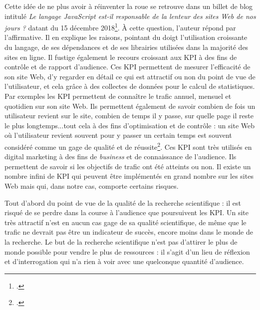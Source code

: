 \documentclass[a4paper,12pt,twoside]{book}
\begin{document}
Cette idée de ne plus avoir à réinventer la roue se retrouve dans un billet de blog intitulé \og \textit{Le langage JavaScript est-il
responsable de la lenteur des sites Web de nos jours ?} \fg datant du 15 décembre 2018\footcite{javascript}. À cette question, l'auteur répond par l'affirmative. Il en explique les raisons, pointant du doigt l'utilisation croissante du langage, de ses dépendances et de ses librairies utilisées dans la majorité des sites en ligne. Il fustige également le recours croissant aux \acrfull{KPI} à des fins de contrôle et de rapport d'audience. Ces \acrshort{KPI} permettent de mesurer l'\og efficacité \fg de son site Web, d'y regarder en détail ce qui est attractif ou non du point de vue de l'utilisateur, et cela grâce à des collectes de données pour le calcul de statistiques. Par exemples les \acrshort{KPI} permettent de connaître le trafic annuel, mensuel et quotidien sur son site Web. Ils permettent également de savoir combien de fois un utilisateur revient sur le site, combien de temps il y passe, sur quelle page il reste le plus longtemps...tout cela à des fins d'optimisation et de contrôle : un site Web où l'utilisateur revient souvent pour y passer un certain temps est souvent considéré comme un gage de qualité et de réussite\footcite{storm_website_2022}. Ces \acrshort{KPI} sont très utilisés en digital marketing à des fins de \textit{business} et de connaissance de l'audience. Ils permettent de savoir si les objectifs de trafic ont été atteints ou non. Il existe un nombre infini de \acrshort{KPI} qui peuvent être implémentés en grand nombre sur les sites Web mais qui, dans notre cas, comporte certains risques.

Tout d'abord du point de vue de la qualité de la recherche scientifique : il est risqué de se perdre dans la course à l'audience que poursuivent les \acrshort{KPI}. Un site très attractif n'est en aucun cas gage de sa qualité scientifique, de même que le trafic ne devrait pas être un indicateur de succès, encore moins dans le monde de la recherche. Le but de la recherche scientifique n'est pas d'attirer le plus de monde possible pour vendre le plus de ressources : il s'agit d'un lieu de réflexion et d'interrogation qui n'a rien à voir avec une quelconque quantité d'audience.
\end{document}
